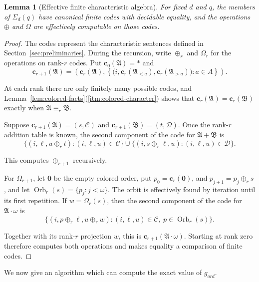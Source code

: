 \documentclass{amsart}
\newtheorem{lemma}{Lemma}
\theoremstyle{definition}
\begin{document}
\begin{lemma}[Effective finite characteristic algebra]\label{lem:effective-characteristic-algebra}
    For fixed $d$ and $q$, the members of $\Sigma_d(q)$ have canonical finite codes with decidable equality, and the operations $\oplus$ and $\Omega$ are effectively computable on those codes.
\end{lemma}
\begin{proof}
    The codes represent the characteristic sentences defined in Section~\ref{sec:preliminaries}. During the recursion, write $\oplus_r$ and $\Omega_r$ for the operations on rank-$r$ codes. Put $\mathbf c_0(\mathfrak A)=*$ and
    $$\mathbf c_{r+1}(\mathfrak A)=\left(\mathbf c_r(\mathfrak A),\left\{\bigl(i,\mathbf c_r(\mathfrak A_{<a}),\mathbf c_r(\mathfrak A_{>a})\bigr):a\in A\right\}\right).$$
    
    At each rank there are only finitely many possible codes, and Lemma~\ref{lem:colored-facts}(\ref{itm:colored-character}) shows that $\mathbf c_r(\mathfrak A)=\mathbf c_r(\mathfrak B)$ exactly when $\mathfrak A\equiv_r\mathfrak B$.

    Suppose $\mathbf c_{r+1}(\mathfrak A)=(s,\mathcal C)$ and $\mathbf c_{r+1}(\mathfrak B)=(t,\mathcal D)$. Once the rank-$r$ addition table is known, the second component of the code for $\mathfrak A+\mathfrak B$ is
    $$\{(i,\ell,u\oplus_r t):(i,\ell,u)\in\mathcal C\}\cup\{(i,s\oplus_r\ell,u):(i,\ell,u)\in\mathcal D\}.$$
    
    This computes $\oplus_{r+1}$ recursively.

    For $\Omega_{r+1}$, let $\mathbf 0$ be the empty colored order, put $p_0=\mathbf c_r(\mathbf 0)$, and $p_{j+1}=p_j\oplus_r s$, and let $\operatorname{Orb}_r(s)=\{p_j:j<\omega\}$. The orbit is effectively found by iteration until its first repetition. If $w=\Omega_r(s)$, then the second component of the code for $\mathfrak A\cdot\omega$ is
    $$\{(i,p\oplus_r\ell,u\oplus_r w):(i,\ell,u)\in\mathcal C,\ p\in\operatorname{Orb}_r(s)\}.$$
    
    Together with its rank-$r$ projection $w$, this is $\mathbf c_{r+1}(\mathfrak A\cdot\omega)$. Starting at rank zero therefore computes both operations and makes equality a comparison of finite codes.
\end{proof}

We now give an algorithm which can compute the exact value of $g_{ord}$.
\end{document}
